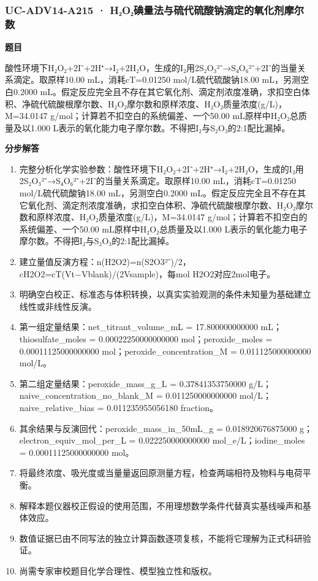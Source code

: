\documentclass[UTF8,11pt,a4paper]{ctexart}
\begin{document}
\subsubsection*{UC-ADV14-A215 · H₂O₂碘量法与硫代硫酸钠滴定的氧化剂摩尔数}
\noindent\textbf{题目}\par
酸性环境下H₂O₂+2I⁻+2H⁺→I₂+2H₂O，生成的I₂用2S₂O₃²⁻→S₄O₆²⁻+2I⁻的当量关系滴定。取原样10.00 mL，消耗cT=0.01250 mol/L硫代硫酸钠18.00 mL，另测空白0.2000 mL。假定反应完全且不存在其它氧化剂、滴定剂浓度准确，求扣空白体积、净硫代硫酸根摩尔数、H₂O₂摩尔数和原样浓度、H₂O₂质量浓度(g/L)，M=34.0147 g/mol；计算若不扣空白的系统偏差、一个50.00 mL原样中H₂O₂总质量及以1.000 L表示的氧化能力电子摩尔数。不得把I₂与S₂O₃的2:1配比漏掉。\par
\medskip\noindent\textbf{分步解答}
\begin{enumerate}
\item 完整分析化学实验参数：酸性环境下H₂O₂+2I⁻+2H⁺→I₂+2H₂O，生成的I₂用2S₂O₃²⁻→S₄O₆²⁻+2I⁻的当量关系滴定。取原样10.00 mL，消耗cT=0.01250 mol/L硫代硫酸钠18.00 mL，另测空白0.2000 mL。假定反应完全且不存在其它氧化剂、滴定剂浓度准确，求扣空白体积、净硫代硫酸根摩尔数、H₂O₂摩尔数和原样浓度、H₂O₂质量浓度(g/L)，M=34.0147 g/mol；计算若不扣空白的系统偏差、一个50.00 mL原样中H₂O₂总质量及以1.000 L表示的氧化能力电子摩尔数。不得把I₂与S₂O₃的2:1配比漏掉。
\item 建立量值反演方程：n(H2O2)=n(S2O3²⁻)/2，cH2O2=cT(Vt−Vblank)/(2Vsample)，每mol H2O2对应2mol电子。
\item 明确空白校正、标准态与体积转换，以真实实验观测的条件未知量为基础建立线性或非线性反演。
\item 第一组定量结果：net\_titrant\_volume\_mL = 17.800000000000 mL；thiosulfate\_moles = 0.00022250000000000 mol；peroxide\_moles = 0.00011125000000000 mol；peroxide\_concentration\_M = 0.011125000000000 mol/L。
\item 第二组定量结果：peroxide\_mass\_g\_L = 0.37841353750000 g/L；naive\_concentration\_no\_blank\_M = 0.011250000000000 mol/L；naive\_relative\_bias = 0.011235955056180 fraction。
\item 其余结果与反演回代：peroxide\_mass\_in\_50mL\_g = 0.018920676875000 g；electron\_equiv\_mol\_per\_L = 0.022250000000000 mol\_e/L；iodine\_moles = 0.00011125000000000 mol。
\item 将最终浓度、吸光度或当量量返回原测量方程，检查两端相符及物料与电荷平衡。
\item 解释本题仪器校正假设的使用范围，不用理想数学条件代替真实基线噪声和基体效应。
\item 数值证据已由不同写法的独立计算函数逐项复核，不能将它理解为正式科研验证。
\item 尚需专家审校题目化学合理性、模型独立性和版权。
\end{enumerate}
\end{document}
